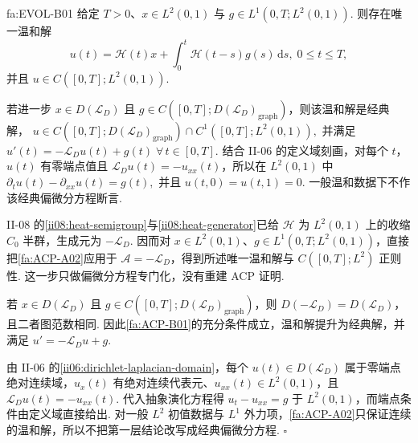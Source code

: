 \begin{FATheorem}{fa:EVOL-B01}
给定 \(\displaystyle T>0\)、\(\displaystyle x\in L^2(0,1)\) 与 \(\displaystyle g\in L^1(0,T;L^2(0,1))\). 则存在唯一温和解
\[
u(t)
=
\mathcal H(t)x
+
\int_0^t
\mathcal H(t-s)g(s)
\,\mathrm{d}s,
\;
0\leqslant t\leqslant T,
\]
并且 \(\displaystyle u\in C([0,T];L^2(0,1))\).

若进一步 \(\displaystyle x\in D(\mathcal L_D)\) 且 \(\displaystyle g\in C([0,T];D(\mathcal L_D)_{\mathrm{graph}})\)，则该温和解是经典解， \(\displaystyle u\in C([0,T];D(\mathcal L_D)_{\mathrm{graph}}) \cap C^1([0,T];L^2(0,1)),\)
并满足 \(\displaystyle u'(t) = -\mathcal L_Du(t)+g(t) \; \forall\,t\in[0,T].\)
结合 II-06 的定义域刻画，对每个 \(\displaystyle t\)，\(\displaystyle u(t)\) 有零端点值且 \(\displaystyle\mathcal L_Du(t)=-u_{xx}(t)\)，所以在 \(\displaystyle L^2(0,1)\) 中 \(\displaystyle \partial_tu(t)-\partial_{xx}u(t) = g(t),\)
并且 \(\displaystyle u(t,0)=u(t,1)=0\). 一般温和数据下不作该经典偏微分方程断言.
\end{FATheorem}

\begin{FAProof}
II-08 的\autoref{ii08:heat-semigroup}与\autoref{ii08:heat-generator}已给 \(\displaystyle\mathcal H\) 为 \(\displaystyle L^2(0,1)\) 上的收缩 \(\displaystyle C_0\) 半群，生成元为 \(\displaystyle-\mathcal L_D\). 因而对 \(\displaystyle x\in L^2(0,1)\)、\(\displaystyle g\in L^1(0,T;L^2(0,1))\)，直接把\autoref{fa:ACP-A02}应用于 \(\displaystyle\mathcal A=-\mathcal L_D\)，得到所述唯一温和解与 \(\displaystyle C([0,T];L^2)\) 正则性. 这一步只做偏微分方程专门化，没有重建 ACP 证明.

若 \(\displaystyle x\in D(\mathcal L_D)\) 且 \(\displaystyle g\in C([0,T];D(\mathcal L_D)_{\mathrm{graph}})\)，则 \(\displaystyle D(-\mathcal L_D)=D(\mathcal L_D)\)，且二者图范数相同. 因此\autoref{fa:ACP-B01}的充分条件成立，温和解提升为经典解，并满足 \(\displaystyle u'=-\mathcal L_Du+g\).

由 II-06 的\autoref{ii06:dirichlet-laplacian-domain}，每个 \(\displaystyle u(t)\in D(\mathcal L_D)\) 属于零端点绝对连续域，\(\displaystyle u_x(t)\) 有绝对连续代表元、\(\displaystyle u_{xx}(t)\in L^2(0,1)\)，且 \(\displaystyle\mathcal L_Du(t)=-u_{xx}(t)\). 代入抽象演化方程得 \(\displaystyle u_t-u_{xx}=g\) 于 \(\displaystyle L^2(0,1)\)，而端点条件由定义域直接给出. 对一般 \(\displaystyle L^2\) 初值数据与 \(\displaystyle L^1\) 外力项，\autoref{fa:ACP-A02}只保证连续的温和解，所以不把第一层结论改写成经典偏微分方程.
\hfill\(\square\)
\end{FAProof}

